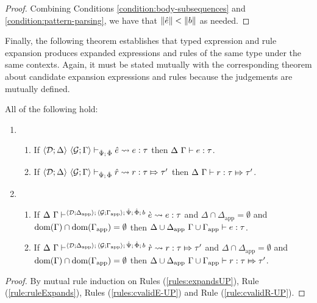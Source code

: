 {{{{\begin{proof}
Combining Conditions \ref{condition:body-subsequences} and \ref{condition:pattern-parsing}, we have that $\Vert {\hat e} \Vert < \Vert b \Vert$ as needed.
\end{proof}

Finally, the following theorem establishes that typed expression and rule expansion produces expanded expressions and rules of the same type under the same contexts. Again, it must be stated mutually with the corresponding theorem about candidate expansion expressions and rules because the judgements are mutually defined.
\begin{theorem} All of the following hold:
\begin{enumerate}
  \item \begin{enumerate}
    \item If $\langle \mathcal{D}; \Delta \rangle~\langle \mathcal{G}; \Gamma \rangle \vdash_{\hat{\Psi};\,\hat\Phi} {\hat e} \leadsto e : \tau$ then $\Delta~\Gamma \vdash e : \tau$.
    \item If $\langle \mathcal{D}; \Delta \rangle~\langle \mathcal{G}; \Gamma \rangle \vdash_{\hat{\Psi};\,\hat\Phi} \hat{r} \leadsto r : \tau \Mapsto \tau'$  then $\Delta~\Gamma \vdash r : \tau \Mapsto \tau'$.
  \end{enumerate}
  \item \begin{enumerate}
    \item If $\Delta~\Gamma\vdash^{\langle \mathcal{D}; \Delta_\text{app} \rangle;\,\langle \mathcal{G}; \Gamma_\text{app} \rangle;\,\hat{\Psi};\,\hat\Phi;\,b} \grave{e} \leadsto e : \tau$ and $\Delta \cap \Delta_\text{app}=\emptyset$ and $\text{dom}(\Gamma) \cap \text{dom}(\Gamma_\text{app})=\emptyset$ then ${\Delta}\cup{\Delta_\text{app}}~{\Gamma}\cup{\Gamma_\text{app}} \vdash e : \tau$. 
    \item If $\Delta~\Gamma \vdash^{\langle \mathcal{D}; \Delta_\text{app} \rangle;\,\langle \mathcal{G}; \Gamma_\text{app} \rangle;\,\hat{\Psi};\,\hat\Phi;\,b} \grave{r} \leadsto r : \tau \Mapsto \tau'$ and $\Delta \cap \Delta_\text{app}=\emptyset$ and $\text{dom}(\Gamma) \cap \text{dom}(\Gamma_\text{app})=\emptyset$ then ${\Delta}\cup{\Delta_\text{app}}~{\Gamma}\cup{\Gamma_\text{app}} \vdash r : \tau \Mapsto \tau'$.
  \end{enumerate}
\end{enumerate}
\end{theorem}
\begin{proof}
By mutual rule induction on Rules (\ref{rules:expandsUP}), Rule (\ref{rule:ruleExpands}), Rules (\ref{rules:cvalidE-UP}) and Rule (\ref{rule:cvalidR-UP}).


\end{proof}}}}}
